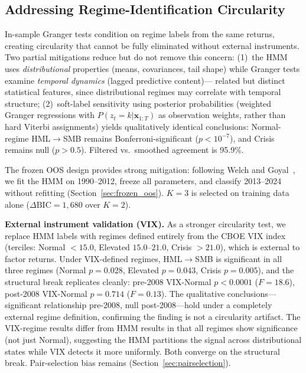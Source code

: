 \documentclass[sigconf,anonymous]{acmart}
\begin{document}
\subsection{Addressing Regime-Identification Circularity}

In-sample Granger tests condition on regime labels from the same returns,
creating circularity that cannot be fully eliminated without external instruments.
Two partial mitigations reduce but do not remove this concern:
(1)~the HMM uses \emph{distributional} properties (means, covariances, tail shape)
while Granger tests examine \emph{temporal dynamics} (lagged predictive content)---
related but distinct statistical features, since distributional regimes
may correlate with temporal structure;
(2)~soft-label sensitivity using posterior probabilities (weighted Granger
regressions with $P(z_t = k | \mathbf{x}_{1:T})$ as observation weights,
rather than hard Viterbi assignments) yields qualitatively identical
conclusions: Normal-regime HML$\to$SMB remains Bonferroni-significant
($p < 10^{-7}$), and Crisis remains null ($p > 0.5$).
Filtered vs.\ smoothed agreement is 95.9\%.

The frozen OOS design provides strong mitigation:
following Welch and Goyal~\cite{welch2008comprehensive}, we fit the HMM on
1990--2012, freeze all parameters, and classify 2013--2024 without refitting
(Section~\ref{sec:frozen_oos}). $K = 3$ is selected on training data alone
($\Delta\text{BIC} = 1{,}680$ over $K = 2$).

\textbf{External instrument validation (VIX).}
As a stronger circularity test, we replace HMM labels with regimes defined
entirely from the CBOE VIX index (terciles: Normal $<15.0$, Elevated
$15.0$--$21.0$, Crisis $>21.0$), which is external to factor returns.
Under VIX-defined regimes, HML$\to$SMB is significant in all three
regimes (Normal $p = 0.028$, Elevated $p = 0.043$, Crisis $p = 0.005$),
and the structural break replicates cleanly: pre-2008 VIX-Normal
$p < 0.0001$ ($F = 18.6$), post-2008 VIX-Normal $p = 0.714$
($F = 0.13$). The qualitative conclusions---significant relationship
pre-2008, null post-2008---hold under a completely external
regime definition, confirming the finding is not a circularity artifact.
The VIX-regime results differ from HMM results in that all regimes
show significance (not just Normal), suggesting the HMM partitions
the signal across distributional states while VIX detects it more
uniformly. Both converge on the structural break.
Pair-selection bias remains (Section~\ref{sec:pairselection}).
\end{document}
